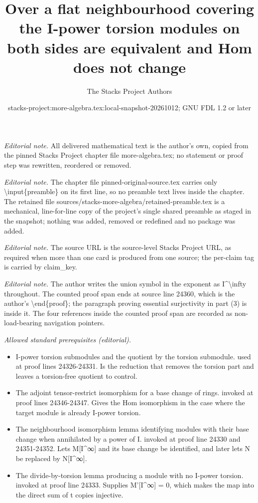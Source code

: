 \documentclass[10pt,a4paper]{amsart}
\title{Over a flat neighbourhood covering the I-power torsion modules on both sides are equivalent and Hom does not change}
\author{The Stacks Project Authors}
\date{stacks-project:more-algebra.tex:local-snapshot-20261012; GNU FDL 1.2 or later}
\theoremstyle{plain}
\theoremstyle{definition}
\theoremstyle{remark}
\numberwithin{equation}{subsection}
\begin{document}
\maketitle
\setcounter{subsection}{1}
\noindent\textit{Editorial note.} All delivered mathematical text is the author's own, copied from the pinned Stacks Project chapter file more-algebra.tex; no statement or proof step was rewritten, reordered or removed.\par\medskip
\noindent\textit{Editorial note.} The chapter file pinned-original-source.tex carries only \textbackslash{}input\{preamble\} on its first line, so no preamble text lives inside the chapter. The retained file sources/stacks-more-algebra/retained-preamble.tex is a mechanical, line-for-line copy of the project's single shared preamble as staged in the snapshot; nothing was added, removed or redefined and no package was added.\par\medskip
\noindent\textit{Editorial note.} The source URL is the source-level Stacks Project URL, as required when more than one card is produced from one source; the per-claim tag is carried by claim\_key.\par\medskip
\noindent\textit{Editorial note.} The author writes the union symbol in the exponent as I\textasciicircum{}\textbackslash{}infty throughout. The counted proof span ends at source line 24360, which is the author's \textbackslash{}end\{proof\}; the paragraph proving essential surjectivity in part (3) is inside it. The four references inside the counted proof span are recorded as non-load-bearing navigation pointers.\par\medskip
\noindent\textit{Allowed standard prerequisites (editorial).}\begin{itemize}
\item I-power torsion submodules and the quotient by the torsion submodule. used at proof lines 24326-24331. Is the reduction that removes the torsion part and leaves a torsion-free quotient to control.
\item The adjoint tensor-restrict isomorphism for a base change of rings. invoked at proof lines 24346-24347. Gives the Hom isomorphism in the case where the target module is already I-power torsion.
\item The neighbourhood isomorphism lemma identifying modules with their base change when annihilated by a power of I. invoked at proof line 24330 and 24351-24352. Lets M[I\textasciicircum{}∞] and its base change be identified, and later lets N be replaced by N[I\textasciicircum{}∞].
\item The divide-by-torsion lemma producing a module with no I-power torsion. invoked at proof line 24333. Supplies M'[I\textasciicircum{}∞] = 0, which makes the map into the direct sum of t copies injective.
\end{itemize}\medskip
\end{document}
